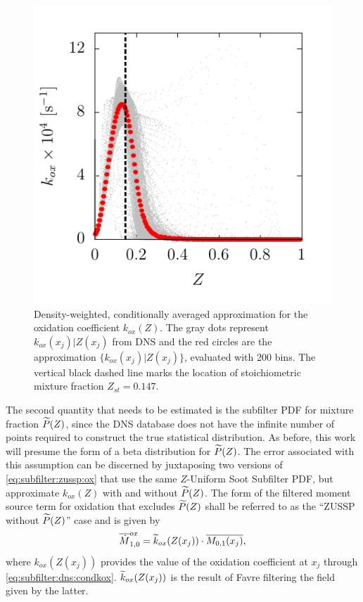 \begin{figure}[htb]
  \centering
  \includegraphics[width=0.43\linewidth]{ch-subfiltermodeling/figures/koxvsz}
  \caption[Approximation for Oxidation Coefficient, $k_{ox}(Z)$]{Density-weighted, conditionally averaged approximation for the oxidation coefficient $k_{ox}(Z)$. The gray dots represent $k_{ox}(x_j)|Z(x_j)$ from DNS and the red circles are the approximation $\{ k_{ox}(x_j)|Z(x_j) \}$, evaluated with 200 bins. The vertical black dashed line marks the location of stoichiometric mixture fraction $Z_{st} = 0.147$.}
  \label{fig:subfilter:dns:kox}
\end{figure}

The second quantity that needs to be estimated is the subfilter PDF for mixture fraction $\pz$, since the DNS database does not have the infinite number of points required to construct the true statistical distribution. As before, this work will presume the form of a beta distribution for $\pz$. The error associated with this assumption can be discerned by juxtaposing two versions of \cref{eq:subfilter:zussp:ox} that use the same $Z$-Uniform Soot Subfilter PDF, but approximate $k_{ox}(Z)$ with and without $\pz$. The form of the filtered moment source term for oxidation that excludes $\pz$ shall be referred to as the ``ZUSSP without $\pz$'' case and is given by
\begin{equation}\label{eq:subfilter:dns:mzusspwithoutpz}
  \fst[M]{1,0}^{ox} = \tf{k}_{ox}(Z(x_j)) \cdot \mean{M_{0,1}(x_j)},
\end{equation}
where $k_{ox}(Z(x_j))$ provides the value of the oxidation coefficient at $x_j$ through \cref{eq:subfilter:dns:condkox}. $\tf{k}_{ox}(Z(x_j))$ is the result of Favre filtering the field given by the latter.


